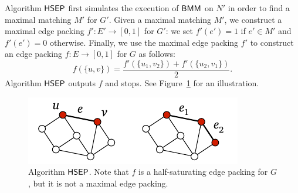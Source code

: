 Algorithm $\textsf{HSEP}$ first simulates the execution of $\textsf{BMM}$ on $N'$ in order to find a maximal matching $M'$ for $G'$. Given a maximal matching $M'$, we construct a maximal edge packing $f'\colon E' \to [0,1]$ for $G'$: we set $f'(e') = 1$ if $e' \in M'$ and $f'(e') = 0$ otherwise. Finally, we use the maximal edge packing $f'$ to construct an edge packing $f\colon E \to [0,1]$ for $G$ as follows:
\[
    f(\{u,v\}) = \frac{f'(\{u_1,v_2\}) + f'(\{u_2,v_1\})}{2}.
\]
Algorithm $\textsf{HSEP}$ outputs $f$ and stops. See Figure~\ref{fig:half-saturating-c} for an illustration.

\begin{figure}
    \centering
    \includegraphics[page=\PHalfSaturatingC]{figs.pdf}
    \caption{Algorithm $\textsf{HSEP}$. Note that $f$ is a half-saturating edge packing for $G$, but it is not a maximal edge packing.}\label{fig:half-saturating-c}
\end{figure}

